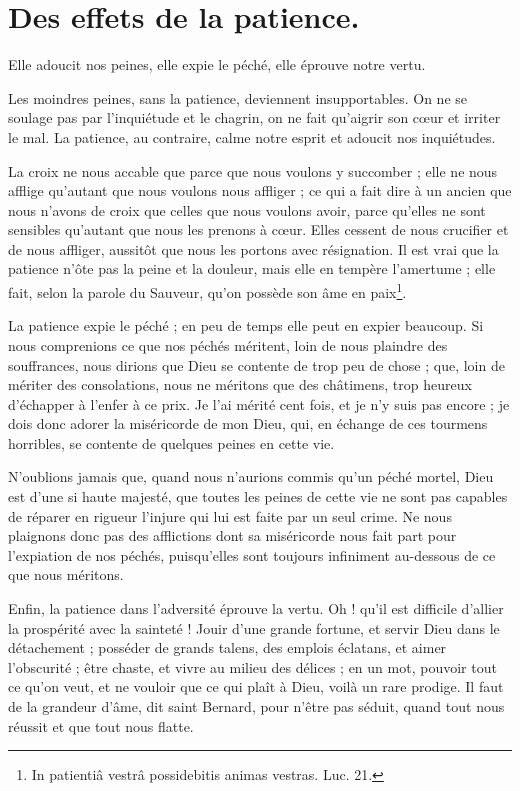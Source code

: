 \documentclass[instructions.tex]{subfiles}
\begin{document}
 
\chapter{Des effets de la patience.}
 
Elle adoucit nos peines, elle expie le péché, elle éprouve notre vertu.
 
\primo Les moindres peines, sans la patience, deviennent insupportables. On ne se soulage pas par l'inquiétude et le chagrin, on ne fait qu'aigrir son cœur et irriter le mal. La patience, au contraire, calme notre esprit et adoucit nos inquiétudes.
 
La croix ne nous accable que parce que nous voulons y succomber ; elle ne nous afflige qu'autant que nous voulons nous affliger ; ce qui a fait dire à un ancien que nous n'avons de croix que celles que nous voulons avoir, parce qu'elles ne sont sensibles qu'autant que nous les prenons à cœur. Elles cessent de nous crucifier et de nous affliger, aussitôt que nous les portons avec résignation. Il est vrai que la patience n'ôte pas la peine et la douleur, mais elle en tempère l'amertume ; elle fait, selon la parole du Sauveur, qu'on possède son âme en paix\footnote{In patientiâ vestrâ possidebitis animas vestras. Luc. 21.}.
 
\secundo La patience expie le péché ; en peu de temps elle peut en expier beaucoup. Si nous comprenions ce que nos péchés méritent, loin de nous plaindre des souffrances, nous dirions que Dieu se contente de trop peu de chose ; que, loin de mériter des consolations, nous ne méritons que des châtimens, trop heureux d'échapper à l'enfer à ce prix. Je l'ai mérité cent fois, et je n'y suis pas encore ; je dois donc adorer la miséricorde de mon Dieu, qui, en échange de ces tourmens horribles, se contente de quelques peines en cette vie.
 
N'oublions jamais que, quand nous n'aurions commis qu'un péché mortel, Dieu est d'une si haute majesté, que toutes les peines de cette vie ne sont pas capables de réparer en rigueur l'injure qui lui est faite par un seul crime. Ne nous plaignons donc pas des afflictions dont sa miséricorde nous fait part pour l'expiation de nos péchés, puisqu'elles sont toujours infiniment au-dessous de ce que nous méritons.
 
\tertio Enfin, la patience dans l'adversité éprouve la vertu. Oh ! qu'il est difficile d'allier la prospérité avec la sainteté ! Jouir d'une grande fortune, et servir Dieu dans le détachement ; posséder de grands talens, des emplois éclatans, et aimer l'obscurité ; être chaste, et vivre au milieu des délices ; en un mot, pouvoir tout ce qu'on veut, et ne vouloir que ce qui plaît à Dieu, voilà un rare prodige. Il faut de la grandeur d'âme, dit saint Bernard, pour n'être pas séduit, quand tout nous réussit et que tout nous flatte.
 
\end{document}
